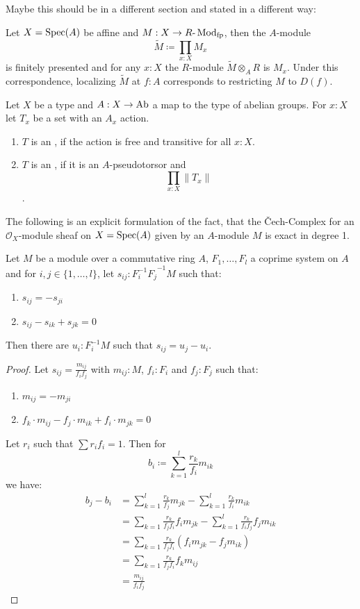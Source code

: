 Maybe this should be in a different section and stated in a different way:
\begin{theorem}
  \label{thm:fp-module}
  Let $X=\operatorname{Spec}(A)$ be affine and $M : X\to R\text{-}\operatorname{Mod}_{\text{fp}}$,
  then the $A$-module
  \[ \tilde{M}\coloneqq\prod_{x:X}M_x \]
  is finitely presented and for any $x:X$ the $R$-module $\tilde{M}\otimes_A R$ is $M_x$.
  Under this correspondence, localizing $\tilde{M}$ at $f:A$ corresponds to restricting $M$ to $D(f)$.
\end{theorem}

\begin{definition}
  Let $X$ be a type and $A:X\to \operatorname{Ab}$ a map to the type of abelian groups.
  For $x:X$ let $T_x$ be a set with an $A_x$ action.
  \begin{enumerate}
  \item $T$ is an , if the action is free and transitive for all $x:X$.
  \item $T$ is an , if it is an $A$-pseudotorsor and
    \[ \prod_{x:X} \| T_x \| \].
  \end{enumerate}
\end{definition}

The following is an explicit formulation of the fact, that the Čech-Complex for an
$\mathcal{O}_X$-module sheaf on $X=\operatorname{Spec}(A)$ given by an $A$-module $M$ is exact in degree 1.
\begin{lemma}
  \label{lem:H1-algebra}
  Let $M$ be a module over a commutative ring $A$, $F_1,\dots,F_l$ a coprime system on $A$
  and for $i,j\in\{1,\dots,l\}$, let $s_{ij}:{F_i^{-1} F_j}^{-1}M$ such that:
  \begin{enumerate}
  \item $s_{ij}=-s_{ji}$
  \item $s_{ij}-s_{ik}+s_{jk}=0$
  \end{enumerate}
  Then there are $u_i:F_i^{-1}M$ such that $s_{ij}=u_j - u_i$.
\end{lemma}
\begin{proof}
  Let $s_{ij}=\frac{m_{ij}}{f_i f_j}$ with $m_{ij}:M$, $f_i:F_i$ and $f_j:F_j$ such that:
  \begin{enumerate}
  \item $m_{ij}=-m_{ji}$
  \item $f_k\cdot m_{ij}-f_j\cdot m_{ik}+f_i\cdot m_{jk}=0$
  \end{enumerate}
  Let $r_i$ such that $\sum r_i f_i =1$.
  Then for
  \[ b_i\coloneqq \sum_{k=1}^l\frac{r_k}{f_i}m_{ik} \]
  we have:
  \begin{align*}
      b_j-b_i &= \sum_{k=1}^l\frac{r_k}{f_j}m_{jk} - \sum_{k=1}^l\frac{r_k}{f_i}m_{ik} \\
              &= \sum_{k=1}\frac{r_k}{f_jf_i}f_i m_{jk} - \sum_{k=1}^l\frac{r_k}{f_i f_j} f_j m_{ik} \\
              &= \sum_{k=1}\frac{r_k}{f_jf_i}(f_i m_{jk} - f_j m_{ik}) \\
              &= \sum_{k=1}\frac{r_k}{f_jf_i}f_km_{ij} \\
              &= \frac{m_{ij}}{f_i f_j}
  \end{align*}
\end{proof}

